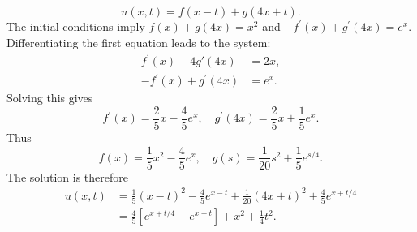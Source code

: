 \documentclass[11pt,a4paper]{article}
\begin{document}
\begin{enumerate}
		$$
		u(x, t) = f(x − t) + g(4x + t).
		$$
		The initial conditions imply $f(x) + g(4x) = x^2$ and $-f^\prime (x) + g^\prime(4x) = e^x$. Differentiating the first equation leads to the system:
		\begin{align*}
			f^\prime (x) + 4g\prime (4x) &= 2x,\\
			-f^\prime (x) + g^\prime (4x) &= e^x.
		\end{align*}
		Solving this gives
		$$
		f^\prime(x) = \frac{2}{5}x - \frac{4}{5}e^x,\quad g^\prime(4x) = \frac{2}{5}x + \frac{1}{5}e^x.
		$$
		Thus
		$$
		f(x) = \frac{1}{5}x^2 - \frac{4}{5}e^x,\quad g(s) = \frac{1}{20}s^2 + \frac{1}{5}e^{s/4}.
		$$
		The solution is therefore
		\begin{align*}
			u(x, t)
			&= \frac{1}{5}(x - t)^2 - \frac{4}{5}e^{x-t} + \frac{1}{20}(4x + t)^2 + \frac{4}{5}e^{x + t/4}\\
			&= \frac{4}{5}[e^{x + t/4} - e^{x - t}] + x^2 + \frac{1}{4}t^2.
		\end{align*}
	\end{enumerate}
\end{document}
